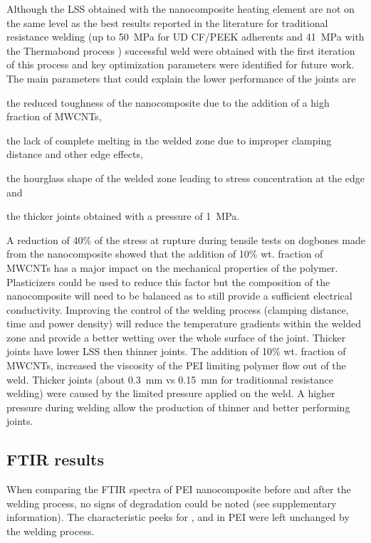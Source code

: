 \documentclass[11pt,review,times]{elsarticle}
\begin{document}
Although the LSS obtained with the nanocomposite heating element are not on the same level as the best results reported in the literature for traditional resistance welding (up to \SI{50}{\MPa} for UD CF/PEEK adherents \cite{Dube2015} and \SI{41}{\MPa} with the Thermabond process \cite{Smiley1991a}) successful weld were obtained with the first iteration of this process and key optimization parameters were identified for future work. 
The main parameters that could explain the lower performance of the joints are \begin{enumerate*}[label=(\arabic*)]
	\item the reduced toughness of the nanocomposite due to the addition of a high fraction of MWCNTs,
	\item the lack of complete melting in the welded zone due to improper clamping distance and other edge effects,
	\item the hourglass shape of the welded zone leading to stress concentration at the edge and
	\item the thicker joints obtained with a pressure of \SI{1}{\MPa}. 
\end{enumerate*}
A reduction of 40\% of the stress at rupture during tensile tests on dogbones made from the nanocomposite showed that the addition of 10\% wt. fraction of MWCNTs has a major impact on the mechanical properties of the polymer. 
Plasticizers could be used to reduce this factor but the composition of the nanocomposite will need to be balanced as to still provide a sufficient electrical conductivity. 
Improving the control of the welding process (clamping distance, time and power density) will reduce the temperature gradients within the welded zone and provide a better wetting over the whole surface of the joint. 
Thicker joints have lower LSS then thinner joints. 
The addition of 10\% wt. fraction of MWCNTs, increased the viscosity of the PEI limiting polymer flow out of the weld. 
Thicker joints (about \SI{0.3}{\mm} vs \SI{0.15}{\mm} for traditionnal resistance welding) were caused by the limited pressure applied on the weld. 
A higher pressure during welding allow the production of thinner and better performing joints. 

\subsection{FTIR results}

When comparing the FTIR spectra of PEI nanocomposite before and after the welding process, no signs of degradation could be noted (see supplementary information). 
The characteristic peeks for ,  and  in PEI were left unchanged by the welding process. 
\end{document}
